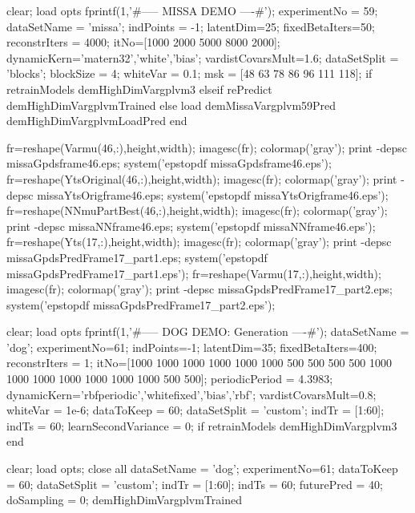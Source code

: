 \begin{matlab}
clear; load opts
fprintf(1,'\n\n#-----  MISSA DEMO ----#\n');
experimentNo = 59;
dataSetName = 'missa';
indPoints = -1; latentDim=25;
fixedBetaIters=50; reconstrIters = 4000;
itNo=[1000 2000 5000 8000 2000]; %
dynamicKern={'matern32','white','bias'};
vardistCovarsMult=1.6;
dataSetSplit = 'blocks';
blockSize = 4; whiteVar = 0.1;
msk = [48 63 78 86 96 111 118];
if retrainModels
    demHighDimVargplvm3
elseif rePredict
    demHighDimVargplvmTrained
else
    load demMissaVargplvm59Pred
    demHighDimVargplvmLoadPred
end

fr=reshape(Varmu(46,:),height,width); imagesc(fr); colormap('gray'); %
print -depsc missaGpdsframe46.eps; system('epstopdf missaGpdsframe46.eps');
fr=reshape(YtsOriginal(46,:),height,width); imagesc(fr); colormap('gray'); %
print -depsc missaYtsOrigframe46.eps; system('epstopdf missaYtsOrigframe46.eps');
fr=reshape(NNmuPartBest(46,:),height,width); imagesc(fr); colormap('gray'); %
print -depsc missaNNframe46.eps; system('epstopdf missaNNframe46.eps');
fr=reshape(Yts(17,:),height,width); imagesc(fr); colormap('gray'); 
print -depsc missaGpdsPredFrame17_part1.eps; system('epstopdf missaGpdsPredFrame17_part1.eps');
fr=reshape(Varmu(17,:),height,width); imagesc(fr); colormap('gray');
print -depsc missaGpdsPredFrame17_part2.eps; system('epstopdf missaGpdsPredFrame17_part2.eps');



clear; load opts
fprintf(1,'\n\n#-----  DOG DEMO: Generation ----#\n');
dataSetName = 'dog';
experimentNo=61;
indPoints=-1; latentDim=35;
fixedBetaIters=400;
reconstrIters = 1; %
itNo=[1000 1000 1000 1000 1000 1000 500 500 500 500 1000 1000 1000 1000 1000 1000 1000 500 500]; %
periodicPeriod = 4.3983; %
dynamicKern={'rbfperiodic','whitefixed','bias','rbf'};
vardistCovarsMult=0.8;
whiteVar = 1e-6;
dataToKeep = 60; dataSetSplit = 'custom';
indTr = [1:60];
indTs = 60; %
learnSecondVariance = 0;
if retrainModels
    demHighDimVargplvm3
end

clear; load opts; close all 
dataSetName = 'dog'; 
experimentNo=61; dataToKeep = 60; dataSetSplit = 'custom';
indTr = [1:60]; indTs = 60;
futurePred = 40; doSampling = 0; demHighDimVargplvmTrained


\end{matlab}
